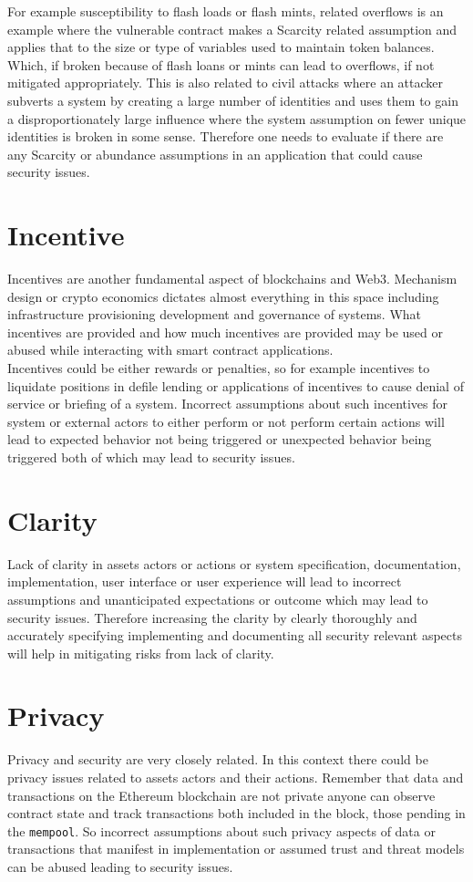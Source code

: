 For example susceptibility to flash loads or flash mints, related overflows is an example where the vulnerable contract makes a Scarcity related assumption and applies that to the size or type of variables used to maintain token balances. Which, if broken because of flash loans or mints can lead to overflows, if not mitigated appropriately. This is also related to civil attacks where an attacker subverts a system by creating a large number of identities and uses them to gain a disproportionately large influence where the system assumption on fewer unique identities is broken in some sense. Therefore one needs to evaluate if there are any Scarcity or abundance assumptions in an application that could cause security issues.

\section{Incentive}
Incentives are another fundamental aspect of blockchains and Web3. Mechanism design or crypto economics dictates almost everything in this space including infrastructure provisioning development and governance of systems. What incentives are provided and how much incentives are provided may be used or abused while interacting with smart contract applications.\\ 

Incentives could be either rewards or penalties, so for example incentives to liquidate positions in defile lending or applications of incentives to cause denial of service or briefing of a system. Incorrect assumptions about such incentives for system or external actors to either perform or not perform certain actions will lead to expected behavior not being triggered or unexpected behavior being triggered both of which may lead to security issues.

\section{Clarity}
Lack of clarity in assets actors or actions or system specification, documentation, implementation, user interface or user experience will lead to incorrect assumptions and unanticipated expectations or outcome which may lead to security issues. Therefore increasing the clarity by clearly thoroughly and accurately specifying implementing and documenting all security relevant aspects will help in mitigating risks from lack of clarity.

\section{Privacy}
Privacy and security are very closely related. In this context there could be privacy issues related to assets actors and their actions. Remember that data and transactions on the Ethereum blockchain are not private anyone can observe contract state and track transactions both included in the block, those pending in the \verb|mempool|. So incorrect assumptions about such privacy aspects of data or transactions that manifest in implementation or assumed trust and threat models can be abused leading to security issues.

